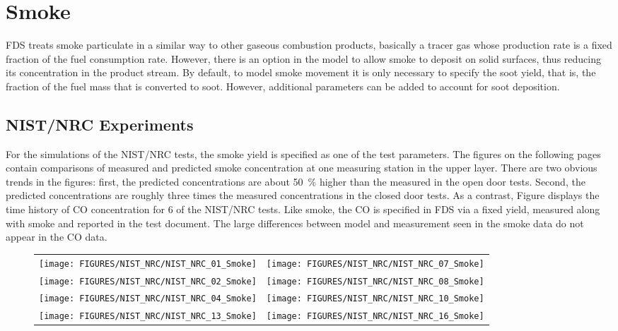 \clearpage


\section{Smoke}

FDS treats smoke particulate in a similar way to other gaseous combustion products, basically a tracer gas whose production rate is a fixed fraction of the fuel consumption rate. However, there is an option in the model to allow smoke to deposit on solid surfaces, thus reducing its concentration in the product stream. By default, to model smoke movement it is only necessary to specify the soot yield, that is, the fraction of the fuel mass that is
converted to soot. However, additional parameters can be added to account for soot deposition.

\subsection{NIST/NRC Experiments}

For the simulations of the NIST/NRC tests, the smoke yield is specified as one of the test parameters.
The figures on the following pages contain comparisons of measured and predicted smoke concentration at one measuring station in the upper layer.
There are two obvious trends in the figures: first, the predicted concentrations are about 50~\% higher than the measured
in the open door tests.  Second,
the predicted concentrations are roughly three times the measured concentrations in the closed door tests.
As a contrast, Figure displays the time history of CO concentration for 6 of the NIST/NRC tests.
Like smoke, the CO is specified in FDS via a fixed yield, measured along with smoke and reported in the test document.
The large differences between model and measurement seen in the smoke data do not appear in the CO data.

\begin{figure}[p]
\begin{tabular*}{\textwidth}{l@{\extracolsep{\fill}}r}
\texttt{[image: FIGURES/NIST\_NRC/NIST\_NRC\_01\_Smoke]} &
\texttt{[image: FIGURES/NIST\_NRC/NIST\_NRC\_07\_Smoke]} \\
\texttt{[image: FIGURES/NIST\_NRC/NIST\_NRC\_02\_Smoke]} &
\texttt{[image: FIGURES/NIST\_NRC/NIST\_NRC\_08\_Smoke]} \\
\texttt{[image: FIGURES/NIST\_NRC/NIST\_NRC\_04\_Smoke]} &
\texttt{[image: FIGURES/NIST\_NRC/NIST\_NRC\_10\_Smoke]} \\
\texttt{[image: FIGURES/NIST\_NRC/NIST\_NRC\_13\_Smoke]} &
\texttt{[image: FIGURES/NIST\_NRC/NIST\_NRC\_16\_Smoke]}
\end{tabular*}
\end{figure}

